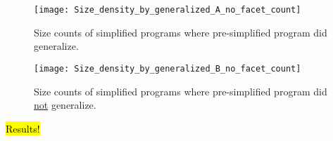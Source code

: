 

\begin{figure}[t] %
\centering
\texttt{[image: Size\_density\_by\_generalized\_A\_no\_facet\_count]}
\caption{Size counts of simplified programs where pre-simplified program did generalize.}
\label{fig:count:pre-simp-gen-true}
\end{figure}

\begin{figure}[t] %
\centering
\texttt{[image: Size\_density\_by\_generalized\_B\_no\_facet\_count]}
\caption{Size counts of simplified programs where pre-simplified program did \underline{not} generalize.}
\label{fig:count:pre-simp-gen-true}
\end{figure}

\hl{Results!}


